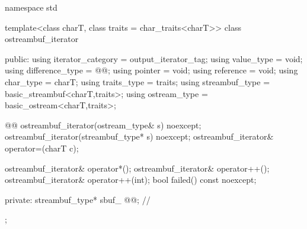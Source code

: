 
%
\begin{codeblock}
namespace std {
  template<class charT, class traits = char_traits<charT>>
  class ostreambuf_iterator {
  public:
    using iterator_category = output_iterator_tag;
    using value_type        = void;
    using difference_type   = @@;
    using pointer           = void;
    using reference         = void;
    using char_type         = charT;
    using traits_type       = traits;
    using streambuf_type    = basic_streambuf<charT,traits>;
    using ostream_type      = basic_ostream<charT,traits>;

    @@
    ostreambuf_iterator(ostream_type& s) noexcept;
    ostreambuf_iterator(streambuf_type* s) noexcept;
    ostreambuf_iterator& operator=(charT c);

    ostreambuf_iterator& operator*();
    ostreambuf_iterator& operator++();
    ostreambuf_iterator& operator++(int);
    bool failed() const noexcept;

  private:
    streambuf_type* sbuf_ @@;                // \expos
  };
}
\end{codeblock}














